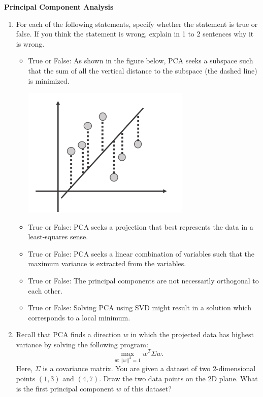 \begin{Q}
\textbf{\Large Principal Component Analysis}\\

\begin{enumerate}

\item For each of the following statements, specify whether the statement is true or false. If you think the statement is wrong, explain in 1 to 2 sentences why it is wrong.


\begin{itemize}
\item True or False: As shown in the figure below, PCA seeks a subspace such that the sum of all the vertical distance to the subspace (the dashed line) is minimized.
\begin{center}
 \includegraphics[width=8cm]{figs/pca.pdf}
 \end{center}

\item True or False: PCA seeks a projection that best represents the data in a least-squares sense.

\item  True or False: PCA seeks a linear combination of variables such that the maximum variance is extracted from the variables. 

\item True or False: The principal components are not necessarily orthogonal to each other. \\

\item True or False: Solving PCA using SVD might result in a solution which corresponds to a local minimum.
\end{itemize}


\item Recall that PCA finds a direction $w$ in which the projected data has highest variance by solving the following program:
	\begin{equation}
	\max_{w:||w||^2=1}w^T\Sigma w.
	\label{equ:pca}
	\end{equation}
	Here, $\Sigma$ is a covariance matrix. You are given a dataset of two 2-dimensional points $(1,3)$ and $(4,7)$. Draw the two data points on the 2D plane. What is the first principal component $w$ of this dataset?


\end{enumerate}
\end{Q}
